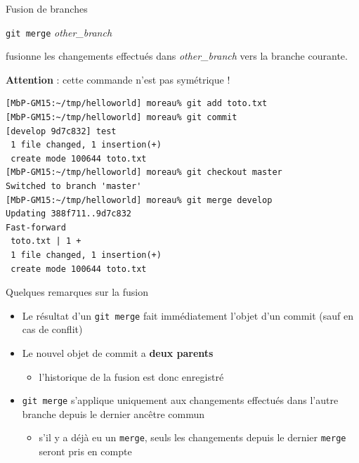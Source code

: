 \begin{frame}[fragile]{%
\protect\hypertarget{fusion-de-branches}{%
Fusion de branches}}

\texttt{git\ merge} \emph{other\_branch}

fusionne les changements effectués dans \emph{other\_branch} vers la
branche courante.

\textbf{Attention} : cette commande n’est pas symétrique !

\begin{verbatim}
[MbP-GM15:~/tmp/helloworld] moreau% git add toto.txt
[MbP-GM15:~/tmp/helloworld] moreau% git commit
[develop 9d7c832] test
 1 file changed, 1 insertion(+)
 create mode 100644 toto.txt
[MbP-GM15:~/tmp/helloworld] moreau% git checkout master
Switched to branch 'master'
[MbP-GM15:~/tmp/helloworld] moreau% git merge develop
Updating 388f711..9d7c832
Fast-forward
 toto.txt | 1 +
 1 file changed, 1 insertion(+)
 create mode 100644 toto.txt
\end{verbatim}

\end{frame}

\begin{frame}[fragile]{%
\protect\hypertarget{quelques-remarques-sur-la-fusion}{%
Quelques remarques sur la fusion}}

\begin{itemize}
\tightlist
\item
  Le résultat d’un \texttt{git\ merge} fait immédiatement l’objet d’un
  commit (sauf en cas de conflit)
\item
  Le nouvel objet de commit a \textbf{deux parents}

  \begin{itemize}
  \tightlist
  \item
    l’historique de la fusion est donc enregistré
  \end{itemize}
\item
  \texttt{git\ merge} s’applique uniquement aux changements effectués
  dans l’autre branche depuis le dernier ancêtre commun

  \begin{itemize}
  \tightlist
  \item
    s’il y a déjà eu un \texttt{merge}, seuls les changements depuis le
    dernier \texttt{merge} seront pris en compte
  \end{itemize}
\end{itemize}

\end{frame}

